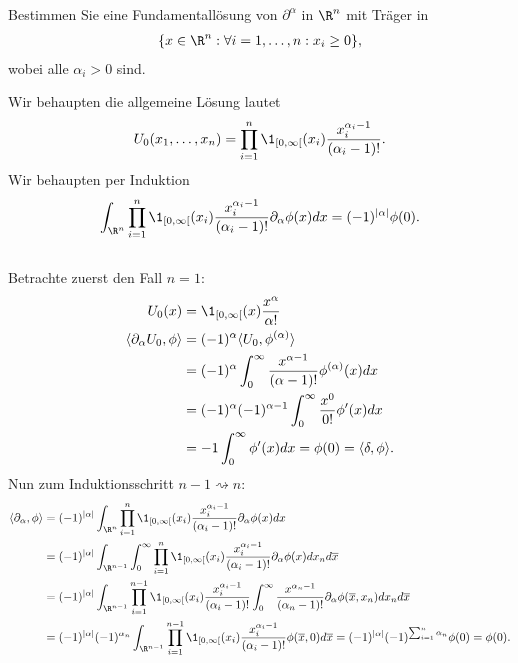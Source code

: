
\begin{exercise}

Bestimmen Sie eine Fundamentallösung von $\partial^{\alpha}$ in $\R^n$ mit Träger in
\begin{align*}
  \{x \in \R^n: \forall i = 1,\dots,n: x_i \geq 0 \},
\end{align*}
wobei alle $\alpha_i > 0$ sind.
\end{exercise}


\begin{solution}

Wir behaupten die allgemeine Lösung lautet
\begin{align*}
  U_0(x_1,\dots,x_n) = \prod_{i=1}^n \1_{[0,\infty[}(x_i) \frac{x_i^{\alpha_i - 1}}{(\alpha_i - 1)!}.
\end{align*}
Wir behaupten per Induktion
\begin{align*}
  \int_{\R^n}\prod_{i=1}^n \1_{[0,\infty[}(x_i) \frac{x_i^{\alpha_i - 1}}{(\alpha_i - 1)!}\partial_{\alpha}\phi(x)dx = (-1)^{|\alpha|}\phi(0).
\end{align*}\\
Betrachte zuerst den Fall $n=1$:
\begin{align*}
  U_0(x) &= \1_{[0,\infty[}(x)\frac{x^{\alpha}}{\alpha!} \\
  \langle \partial_{\alpha} U_0, \phi \rangle &= (-1)^{\alpha} \langle U_0, \phi^{(\alpha)} \rangle \\
  &= (-1)^{\alpha} \int_0^{\infty} \frac{x^{\alpha - 1}}{(\alpha - 1)!} \phi^{(\alpha)}(x) dx \\
  &= (-1)^{\alpha}(-1)^{\alpha - 1}\int_0^{\infty}\frac{x^0}{0!}\phi^{\prime}(x)dx \\
  &= -1\int_0^{\infty}\phi^{\prime}(x)dx = \phi(0) = \langle \delta, \phi \rangle.
\end{align*}
Nun zum Induktionsschritt $n-1 \rightsquigarrow n$:
\begin{align*}
  \langle \partial_{\alpha}, \phi \rangle &= (-1)^{|\alpha|}\int_{\R^n}\prod_{i=1}^n \1_{[0,\infty[}(x_i) \frac{x_i^{\alpha_i - 1}}{(\alpha_i - 1)!}\partial_{\alpha}\phi(x)dx \\
  &= (-1)^{|\alpha|}\int_{\R^{n-1}}\int_{0}^{\infty}\prod_{i=1}^n \1_{[0,\infty[}(x_i) \frac{x_i^{\alpha_i - 1}}{(\alpha_i - 1)!}\partial_{\alpha}\phi(x) dx_n d\overline{x} \\
  &= (-1)^{|\alpha|}\int_{\R^{n-1}}\prod_{i=1}^{n-1} \1_{[0,\infty[}(x_i) \frac{x_i^{\alpha_i - 1}}{(\alpha_i - 1)!}\int_{0}^{\infty} \frac{x^{\alpha_n - 1}}{(\alpha_n - 1)!}\partial_{\alpha}\phi(\overline{x},x_n) dx_n d\overline{x} \\
  &= (-1)^{|\alpha|}(-1)^{\alpha_n}\int_{\R^{n-1}}\prod_{i=1}^{n-1} \1_{[0,\infty[}(x_i) \frac{x_i^{\alpha_i - 1}}{(\alpha_i - 1)!}\phi(\overline{x},0)d\overline{x}  = (-1)^{|\alpha|}(-1)^{\sum_{i=1}^n\alpha_n}\phi(0) = \phi(0).\\
\end{align*}
\end{solution}

